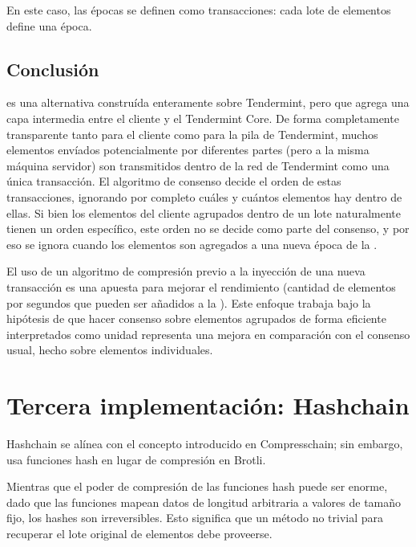 %
En este caso, las épocas se definen como transacciones: cada lote de elementos define una época.


\subsection{Conclusión}
\compresschain es una alternativa construída enteramente sobre Tendermint, pero que agrega una capa
intermedia entre el cliente y el Tendermint Core.
De forma completamente transparente tanto para el
cliente como para la pila de Tendermint, muchos elementos envíados potencialmente por diferentes partes
(pero a la misma máquina servidor)
son transmitidos dentro de la red de Tendermint como una única transacción.
El algoritmo de consenso
decide el orden de estas transacciones, ignorando por completo cuáles y cuántos elementos hay dentro de ellas.
Si bien los elementos del cliente agrupados dentro de un lote naturalmente tienen un orden específico,
este orden no se decide como parte del consenso, y por eso se ignora cuando los elementos son agregados
a una nueva época de la \setchain.

%

El uso de un algoritmo de compresión previo a la inyección de una nueva transacción es una apuesta para mejorar
el rendimiento (cantidad de elementos por segundos que pueden ser añadidos a la \setchain).
Este enfoque trabaja bajo la hipótesis
de que hacer consenso sobre elementos agrupados de forma eficiente interpretados como unidad representa una
mejora en comparación con el consenso usual, hecho sobre elementos individuales.

\section{Tercera implementación: Hashchain}\label{subsec:hashchain}
%
Hashchain se alínea con el concepto introducido en Compresschain; sin embargo, usa
funciones hash en lugar de compresión en Brotli.

%
Mientras que el poder de compresión de las funciones hash puede ser enorme, dado que las funciones
mapean datos de longitud arbitraria a valores de tamaño fijo, los hashes son irreversibles. Esto
significa que un método no trivial para recuperar el lote original de elementos debe proveerse.

